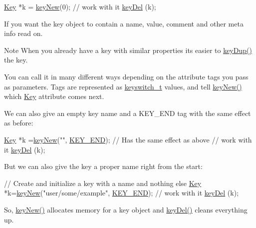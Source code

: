 \begin{DoxyCodeInclude}
\hyperlink{classkdb_1_1Key_a5679f5cae63caddd64a60388b9cc77fa}{Key} *k = \hyperlink{group__key_gad23c65b44bf48d773759e1f9a4d43b89}{keyNew}(0);
\textcolor{comment}{// work with it}
\hyperlink{group__key_ga3df95bbc2494e3e6703ece5639be5bb1}{keyDel} (k);
\end{DoxyCodeInclude}
 If you want the key object to contain a name, value, comment and other meta info read on.

\begin{DoxyNote}{Note}
When you already have a key with similar properties its easier to \hyperlink{group__key_gae6ec6a60cc4b8c1463fa08623d056ce3}{key\+Dup()} the key.
\end{DoxyNote}
You can call it in many different ways depending on the attribute tags you pass as parameters. Tags are represented as \hyperlink{group__key_ga91fb3178848bd682000958089abbaf40}{keyswitch\+\_\+t} values, and tell \hyperlink{group__key_gad23c65b44bf48d773759e1f9a4d43b89}{key\+New()} which \hyperlink{classkdb_1_1Key}{Key} attribute comes next.

We can also give an empty key name and a K\+E\+Y\+\_\+\+E\+N\+D tag with the same effect as before\+:


\begin{DoxyCodeInclude}
\hyperlink{classkdb_1_1Key_a5679f5cae63caddd64a60388b9cc77fa}{Key} *k =\hyperlink{group__key_gad23c65b44bf48d773759e1f9a4d43b89}{keyNew}(\textcolor{stringliteral}{""}, \hyperlink{group__key_gga91fb3178848bd682000958089abbaf40aa8adb6fcb92dec58fb19410eacfdd403}{KEY\_END}); \textcolor{comment}{// Has the same effect as above}
\textcolor{comment}{// work with it}
\hyperlink{group__key_ga3df95bbc2494e3e6703ece5639be5bb1}{keyDel} (k);
\end{DoxyCodeInclude}
 But we can also give the key a proper name right from the start\+:


\begin{DoxyCodeInclude}
\textcolor{comment}{// Create and initialize a key with a name and nothing else}
\hyperlink{classkdb_1_1Key_a5679f5cae63caddd64a60388b9cc77fa}{Key} *k=\hyperlink{group__key_gad23c65b44bf48d773759e1f9a4d43b89}{keyNew}(\textcolor{stringliteral}{"user/some/example"}, \hyperlink{group__key_gga91fb3178848bd682000958089abbaf40aa8adb6fcb92dec58fb19410eacfdd403}{KEY\_END});
\textcolor{comment}{// work with it}
\hyperlink{group__key_ga3df95bbc2494e3e6703ece5639be5bb1}{keyDel} (k);
\end{DoxyCodeInclude}
 So, \hyperlink{group__key_gad23c65b44bf48d773759e1f9a4d43b89}{key\+New()} allocates memory for a key object and \hyperlink{group__key_ga3df95bbc2494e3e6703ece5639be5bb1}{key\+Del()} cleans everything up.

